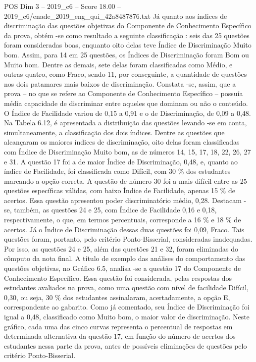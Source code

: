 \begin{textsample}{POS Dim 3 – 2019\_c6 – Score 18.00 – 2019\_c6/enade\_2019\_eng\_qui\_42a8487876.txt}
Já quanto aos índices de discriminação das questões objetivas do Componente de Conhecimento Específico da prova, obtém -se como resultado a seguinte classificação : seis das 25 questões foram consideradas boas, enquanto oito delas teve Índice de Discriminação Muito bom.
Assim, para 14 em 25 questões, os Índices de Discriminação foram Bom ou Muito bom.
Dentre as demais, sete delas foram classificadas como Médio, e outras quatro, como Fraco, sendo 11, por conseguinte, a quantidade de questões nos dois patamares mais baixos de discriminação.
Constata -se, assim, que a prova – no que se refere ao Componente de Conhecimento Específico – possuía média capacidade de discriminar entre aqueles que dominam ou não o conteúdo.
O Índice de Facilidade variou de 0,15 a 0,91 e o de Discriminação, de 0,09 a 0,48.
Na Tabela 6.12, é apresentada a distribuição das questões levando -se em conta, simultaneamente, a classificação dos dois índices.
Dentre as questões que alcançaram os maiores índices de discriminação, oito delas foram classificadas com Índice de Discriminação Muito bom, as de números 14, 15, 17, 18, 22, 26, 27 e 31.
A questão 17 foi a de maior Índice de Discriminação, 0,48, e, quanto ao índice de Facilidade, foi classificada como Difícil, com 30 \% dos estudantes marcando a opção correta.
A questão de número 30 foi a mais difícil entre as 25 questões específicas válidas, com baixo Índice de Facilidade, apenas 15 \% de acertos.
Essa questão apresentou poder discriminatório médio, 0,28.
Destacam -se, também, as questões 24 e 25, com Índice de Facilidade 0,16 e 0,18, respectivamente, o que, em termos percentuais, corresponde a 16 \% e 18 \% de acertos.
Já o Índice de Discriminação dessas duas questões foi 0,09, Fraco.
Tais questões foram, portanto, pelo critério Ponto-Bisserial, consideradas inadequadas.
Por isso, as questões 24 e 25, além das questões 21 e 32, foram eliminadas do cômputo da nota final.
A título de exemplo das análises do comportamento das questões objetivas, no Gráfico 6.5, analisa -se a questão 17 do Componente de Conhecimento Específico.
Essa questão foi considerada, pelas respostas dos estudantes avaliados na prova, como uma questão com nível de facilidade Difícil, 0,30, ou seja, 30 \% dos estudantes assinalaram, acertadamente, a opção E, correspondente ao gabarito.
Como já comentado, seu Índice de Discriminação foi igual a 0,48, classificado como Muito bom, o maior valor de discriminação.
Neste gráfico, cada uma das cinco curvas representa o percentual de respostas em determinada alternativa da questão 17, em função do número de acertos dos estudantes nessa parte da prova, antes de possíveis eliminações de questões pelo critério Ponto-Bisserial.

\end{textsample}
